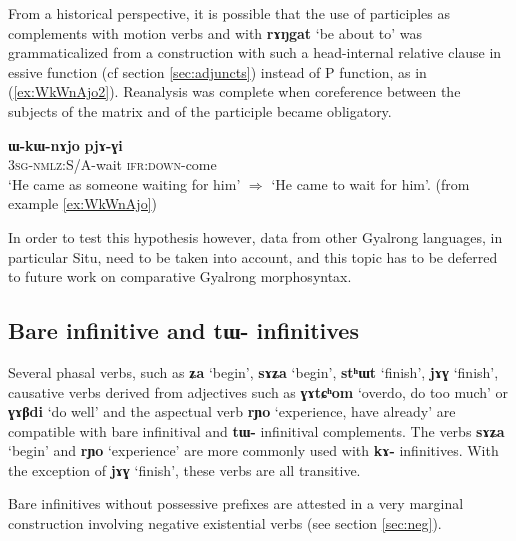 \documentclass[oneside,a4paper,11pt]{article}
\newcommand{\ipa}[1]{\textbf{\phon#1}} %
\newcommand{\jpg}[2]{\ipa{#1} `#2'} %
\begin{document}
From a historical perspective, it is possible that the use of participles as complements with motion verbs and with \jpg{rɤŋgat}{be about to} was grammaticalized from a construction with such a head-internal relative clause in essive function (cf section \ref{sec:adjuncts}) instead of P function, as in (\ref{ex:WkWnAjo2}). Reanalysis was complete when coreference between the subjects of the matrix and of the participle became obligatory.

\begin{exe}
\ex \label{ex:WkWnAjo2}
\gll 	\ipa{ɯ-kɯ-nɤjo} 	\ipa{pjɤ-ɣi} \\
 \textsc{3sg-nmlz:S/A}-wait \textsc{ifr:down}-come \\
\glt *`He came as someone waiting for him' $\Rightarrow$ `He came to wait for him'. (from example \ref{ex:WkWnAjo})
\end{exe}

In order to test this hypothesis however, data from other Gyalrong languages, in particular Situ, need to be taken into account, and this topic has to be deferred to future work on comparative Gyalrong morphosyntax.

 \subsection{Bare infinitive and \ipa{tɯ-} infinitives} \label{sec:bareinf}
Several phasal verbs, such as \jpg{ʑa}{begin}, \jpg{sɤʑa}{begin}, \jpg{stʰɯt}{finish}, \jpg{jɤɣ}{finish}, causative verbs derived from adjectives such as \jpg{ɣɤtɕʰom}{overdo, do too much} or \jpg{ɣɤβdi}{do well} and the aspectual verb \jpg{rɲo}{experience, have already} are compatible with bare infinitival and \ipa{tɯ-} infinitival complements. The verbs \jpg{sɤʑa}{begin} and \jpg{rɲo}{experience} are more commonly used with \ipa{kɤ-} infinitives. With the exception of \jpg{jɤɣ}{finish}, these verbs are all transitive.

Bare infinitives without possessive prefixes are attested in a very marginal construction involving negative existential verbs (see section \ref{sec:neg}).
\end{document}
